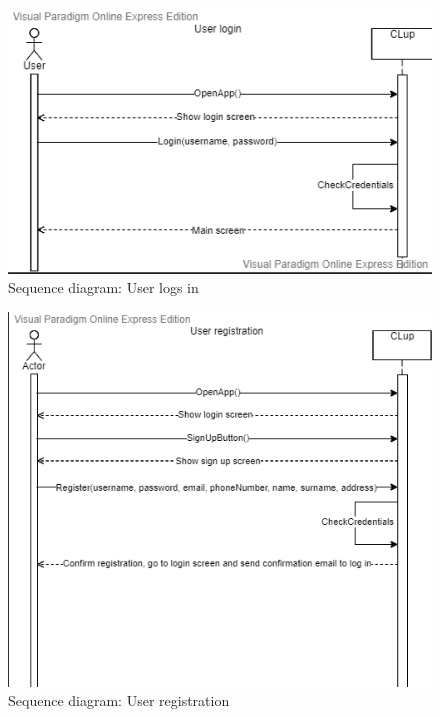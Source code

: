 \begin{figure}[H]
	\includegraphics[width=\linewidth]{../Diagrams/UserLogin.png}
	\caption{Sequence diagram: User logs in}
	\label{fig:UserLog}
\end{figure} 

\begin{figure}[H]
	\includegraphics[width=\linewidth]{../Diagrams/UserRegistration.png}
	\caption{Sequence diagram: User registration}
	\label{fig:UserReg}
\end{figure} 

